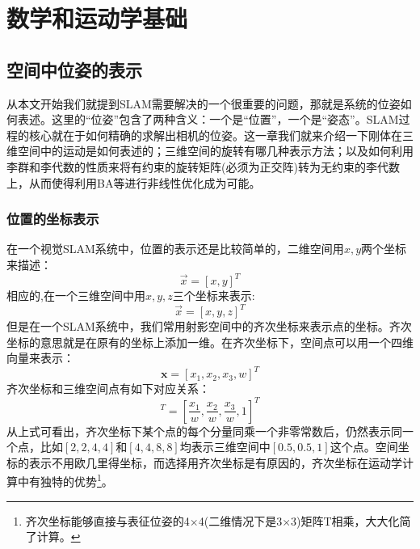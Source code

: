 \chapter{数学和运动学基础}
\section{空间中位姿的表示}
从本文开始我们就提到SLAM需要解决的一个很重要的问题，那就是系统的位姿如何表述。这里的“位姿”包含了两种含义：一个是“位置”，一个是“姿态”。SLAM过程的核心就在于如何精确的求解出相机的位姿。这一章我们就来介绍一下刚体在三维空间中的运动是如何表述的；三维空间的旋转有哪几种表示方法；以及如何利用李群和李代数的性质来将有约束的旋转矩阵(必须为正交阵)转为无约束的李代数上，从而使得利用BA等进行非线性优化成为可能。
\subsection{位置的坐标表示}
在一个视觉SLAM系统中，位置的表示还是比较简单的，二维空间用$x,y$两个坐标来描述：
\begin{equation}
	\vec x = [x,y]^T
\end{equation}
相应的,在一个三维空间中用$x,y,z$三个坐标来表示:
\begin{equation}
	\vec x = [x,y,z]^T
\end{equation}
但是在一个SLAM系统中，我们常用射影空间中的齐次坐标来表示点的坐标。齐次坐标的意思就是在原有的坐标上添加一维。在齐次坐标下，空间点可以用一个四维向量来表示：
\begin{equation}
\boldsymbol{x}=\left[x_{1}, x_{2}, x_{3}, w\right]^{T}
\end{equation}
齐次坐标和三维空间点有如下对应关系：
\begin{equation}
	[x,y,z,1]^T=\left[\frac{x_{1}}{w}, \frac{x_{2}}{w}, \frac{x_{3}}{w}, 1\right]^{T}
\end{equation}
从上式可看出，齐次坐标下某个点的每个分量同乘一个非零常数后，仍然表示同一个点，比如$[2,2,4,4]$和$[4,4,8,8]$均表示三维空间中$[0.5,0.5,1]$这个点。空间坐标的表示不用欧几里得坐标，而选择用齐次坐标是有原因的，齐次坐标在运动学计算中有独特的优势\footnote{齐次坐标能够直接与表征位姿的4$\times$4(二维情况下是3$\times$3)矩阵T相乘，大大化简了计算。}。\par

